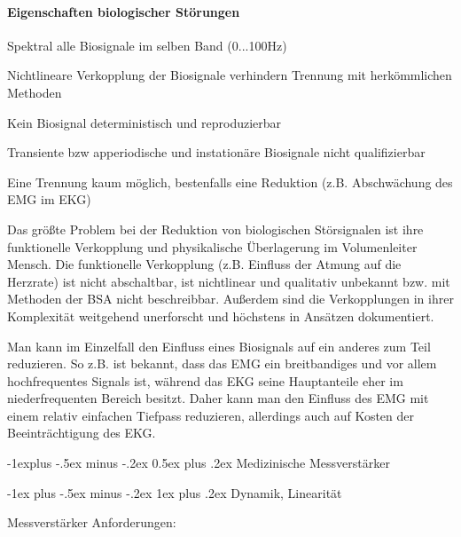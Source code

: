 \documentclass[a4paper]{article}
\makeatletter
\renewcommand{\subsection}{\@startsection{subsection}{2}{0mm}%
 {-1explus -.5ex minus -.2ex}%
 {0.5ex plus .2ex}%
 {\normalfont\normalsize\bfseries}}
\renewcommand{\subsubsection}{\@startsection{subsubsection}{3}{0mm}%
 {-1ex plus -.5ex minus -.2ex}%
 {1ex plus .2ex}%
 {\normalfont\small\bfseries}}
\makeatother
\begin{document}
\begin{multicols}{3}
  \paragraph{Eigenschaften biologischer Störungen}\label{eigenschaften-biologischer-stuxf6rungen}

  \begin{itemize*}
    \item Spektral alle Biosignale im selben Band (0...100Hz)
    \item Nichtlineare Verkopplung der Biosignale verhindern Trennung mit herkömmlichen Methoden
    \item Kein Biosignal deterministisch und reproduzierbar
    \item Transiente bzw apperiodische und instationäre Biosignale nicht qualifizierbar
    \item Eine Trennung kaum möglich, bestenfalls eine Reduktion (z.B. Abschwächung des EMG im EKG)
  \end{itemize*}

  Das größte Problem bei der Reduktion von biologischen Störsignalen ist
  ihre funktionelle Verkopplung und physikalische Überlagerung im
  Volumenleiter Mensch. Die funktionelle Verkopplung (z.B. Einfluss der
  Atmung auf die Herzrate) ist nicht abschaltbar, ist nichtlinear und
  qualitativ unbekannt bzw. mit Methoden der BSA nicht beschreibbar.
  Außerdem sind die Verkopplungen in ihrer Komplexität weitgehend
  unerforscht und höchstens in Ansätzen dokumentiert.

  Man kann im Einzelfall den Einfluss eines Biosignals auf ein anderes zum
  Teil reduzieren. So z.B. ist bekannt, dass das EMG ein breitbandiges und
  vor allem hochfrequentes Signals ist, während das EKG seine Hauptanteile
  eher im niederfrequenten Bereich besitzt. Daher kann man den Einfluss
  des EMG mit einem relativ einfachen Tiefpass reduzieren, allerdings auch
  auf Kosten der Beeinträchtigung des EKG.

  \subsection{Medizinische Messverstärker}\label{medizinische-messverstuxe4rker}

  \subsubsection{Dynamik, Linearität}\label{dynamik-linearituxe4t}

  Messverstärker Anforderungen:


\end{multicols}
\end{document}
